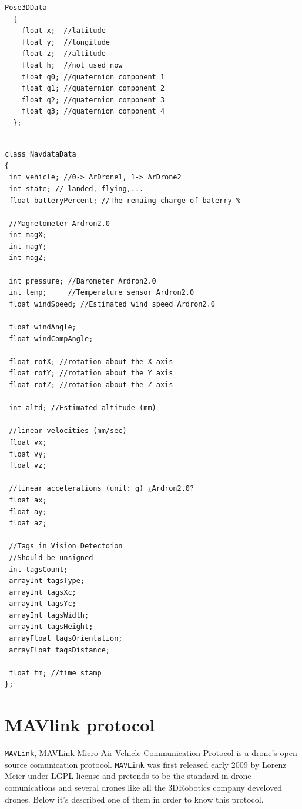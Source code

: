 \documentclass{llncs}
\begin{document}
\begin{verbatim}
Pose3DData
  {
	float x;  //latitude
	float y;  //longitude
	float z;  //altitude
	float h;  //not used now
	float q0; //quaternion component 1
	float q1; //quaternion component 2
	float q2; //quaternion component 3
	float q3; //quaternion component 4
  };
  
\end{verbatim}

\begin{verbatim}
class NavdataData 
{
 int vehicle; //0-> ArDrone1, 1-> ArDrone2
 int state; // landed, flying,...
 float batteryPercent; //The remaing charge of baterry %
		
 //Magnetometer Ardron2.0
 int magX;
 int magY;
 int magZ;
		
 int pressure; //Barometer Ardron2.0
 int temp;     //Temperature sensor Ardron2.0
 float windSpeed; //Estimated wind speed Ardron2.0		
		
 float windAngle;
 float windCompAngle;
 
 float rotX; //rotation about the X axis
 float rotY; //rotation about the Y axis		
 float rotZ; //rotation about the Z axis
 
 int altd; //Estimated altitude (mm) 

 //linear velocities (mm/sec)
 float vx;
 float vy;
 float vz;
		
 //linear accelerations (unit: g) ¿Ardron2.0?
 float ax;
 float ay;
 float az;

 //Tags in Vision Detectoion
 //Should be unsigned
 int tagsCount;
 arrayInt tagsType;
 arrayInt tagsXc;
 arrayInt tagsYc;
 arrayInt tagsWidth;
 arrayInt tagsHeight;
 arrayFloat tagsOrientation;
 arrayFloat tagsDistance;

 float tm; //time stamp
};
\end{verbatim}


\section{MAVlink protocol}

\texttt{MAVLink}, MAVLink Micro Air Vehicle Communication Protocol is a drone's open source comunication protocol.  \texttt{MAVLink} was first released early 2009 by Lorenz Meier under LGPL license and pretends to be the standard in drone comunications and several drones like all the 3DRobotics company develoved drones.
Below it's described one of them in order to know this protocol.
\end{document}
